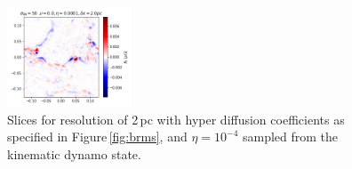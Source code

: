\documentclass[preprint2]{aastex63}
\begin{document}
\begin{figure}
\includegraphics[trim=0.0cm 0.00cm 0.0cm 0.0cm,clip=true,width=0.33\textwidth]{csc_figs/bb12pcPm0e-4_00.png}
\caption{
Slices for resolution of 2\,pc with hyper diffusion coefficients as 
specified in Figure\,\ref{fig:brms}, and $\eta=10^{-4}$ sampled from the 
kinematic dynamo state.
\label{fig:2pcUB}
}
\end{figure}

\end{document}

